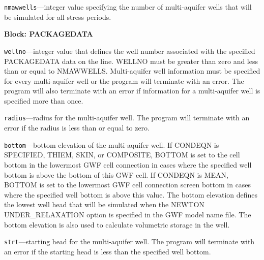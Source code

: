 \begin{description}
\item \texttt{nmawwells}---integer value specifying the number of multi-aquifer wells that will be simulated for all stress periods.

\end{description}
\item \textbf{Block: PACKAGEDATA}

\begin{description}
\item \texttt{wellno}---integer value that defines the well number associated with the specified PACKAGEDATA data on the line. WELLNO must be greater than zero and less than or equal to NMAWWELLS. Multi-aquifer well information must be specified for every multi-aquifer well or the program will terminate with an error.  The program will also terminate with an error if information for a multi-aquifer well is specified more than once.

\item \texttt{radius}---radius for the multi-aquifer well. The program will terminate with an error if the radius is less than or equal to zero.

\item \texttt{bottom}---bottom elevation of the multi-aquifer well. If CONDEQN is SPECIFIED, THIEM, SKIN, or COMPOSITE, BOTTOM is set to the cell bottom in the lowermost GWF cell connection in cases where the specified well bottom is above the bottom of this GWF cell. If CONDEQN is MEAN, BOTTOM is set to the lowermost GWF cell connection screen bottom in cases where the specified well bottom is above this value. The bottom elevation defines the lowest well head that will be simulated when the NEWTON UNDER\_RELAXATION option is specified in the GWF model name file. The bottom elevation is also used to calculate volumetric storage in the well.

\item \texttt{strt}---starting head for the multi-aquifer well. The program will terminate with an error if the starting head is less than the specified well bottom.


\end{description}
